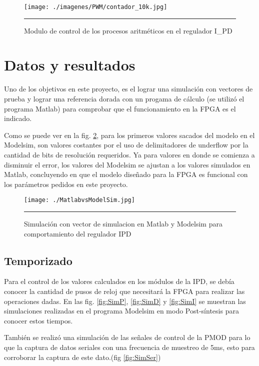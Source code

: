 \documentclass[12pt,a4paper]{article} %
\begin{document}
\begin{figure}[htbp]
  \centering
    \texttt{[image: ./imagenes/PWM/contador\_10k.jpg]}
    \rule{35em}{0.3pt}
  \caption[10k]{Modulo de control de los procesos aritméticos en el regulador I\_PD}
  \label{fig:10k}
\end{figure}

\section{Datos y resultados}

Uno de los objetivos en este proyecto, es el lograr una simulación con vectores de prueba y lograr una referencia dorada con un progama de cálculo (se utilizó el programa Matlab) para comprobar que el funcionamiento en la FPGA es el indicado.

Como se puede ver en la fig. \ref{fig:Matlab}, para los primeros valores sacados del modelo en el Modelsim, son valores costantes por el uso de delimitadores de underflow por la cantidad de bits de resolución requeridos. Ya para valores en donde se comienza a disminuir el error, los valores del Modelsim se ajustan a los valores simulados en Matlab, concluyendo en que el modelo diseñado para la FPGA es funcional con los parámetros pedidos en este proyecto.

\begin{figure}[htbp]
  \centering
    \texttt{[image: ./MatlabvsModelSim.jpg]}
    \rule{35em}{0.3pt}
  \caption[Matlab]{Simulación con vector de simulacion en Matlab y Modelsim para comportamiento del regulador IPD}
  \label{fig:Matlab}
\end{figure}

\subsection{Temporizado}

Para el control de los valores calculados en los módulos de la IPD, se debía conocer la cantidad de pusos de reloj que necesitará la FPGA para realizar las operaciones dadas. En las fig. \ref{fig:SimP}, \ref{fig:SimD} y \ref{fig:SimI} se muestran las simulaciones realizadas en el programa Modelsim en modo Post-síntesis para conocer estos tiempos.

También se realizó una simulación de las señales de control de la PMOD para lo que la captura de datos seriales con una frecuencia de muestreo de 5ms, esto para corroborar la captura de este dato.(fig \ref{fig:SimSer})
\end{document}
